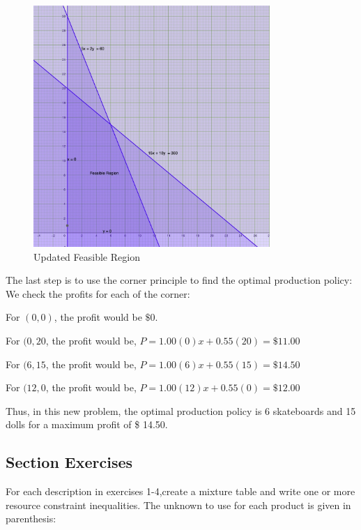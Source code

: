 \documentclass[
  letterpaper,
  DIV=11,
  numbers=noendperiod]{scrreprt}
\begin{document}
\begin{figure}

{\centering \includegraphics[width=0.8\textwidth,height=\textheight]{images/b.jpeg}

}

\caption{Updated Feasible Region}

\end{figure}

The last step is to use the corner principle to find the optimal
production policy: We check the profits for each of the corner:

For \((0,0)\), the profit would be \(\$0\).

For \((0,20\), the profit would be, \(P=1.00 (0)x+0.55(20)=\$11.00\)

For \((6,15\), the profit would be, \(P=1.00 (6)x+0.55(15)=\$14.50\)

For \((12,0\), the profit would be, \(P=1.00 (12)x+0.55(0)=\$12.00\)

Thus, in this new problem, the optimal production policy is 6
skateboards and 15 dolls for a maximum profit of \$ 14.50.

\hypertarget{section-exercises}{%
\subsection{Section Exercises}\label{section-exercises}}

For each description in exercises 1-4,create a mixture table and write
one or more resource constraint inequalities. The unknown to use for
each product is given in parenthesis:
\end{document}
